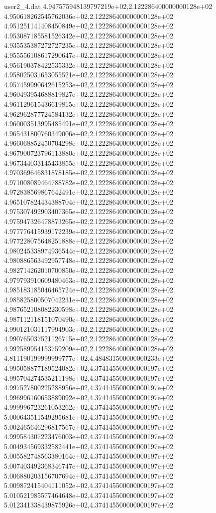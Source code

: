 \begin{filecontents}{user2_4.dat}
4.947575948139797219e+02,2.122286400000000128e+02
4.950618262545762036e+02,2.122286400000000128e+02
4.951251141408450849e+02,2.122286400000000128e+02
4.953087185581526342e+02,2.122286400000000128e+02
4.935535387272727235e+02,2.122286400000000128e+02
4.955556108617290647e+02,2.122286400000000128e+02
4.956190378422535332e+02,2.122286400000000128e+02
4.958025031653055521e+02,2.122286400000000128e+02
4.957459990642615253e+02,2.122286400000000128e+02
4.960493954688819827e+02,2.122286400000000128e+02
4.961129615436619815e+02,2.122286400000000128e+02
4.962962877724584132e+02,2.122286400000000128e+02
4.960003513995485491e+02,2.122286400000000128e+02
4.965431800760349006e+02,2.122286400000000128e+02
4.966068852450704298e+02,2.122286400000000128e+02
4.967900723796113880e+02,2.122286400000000128e+02
4.967344033145433855e+02,2.122286400000000128e+02
4.970369646831878185e+02,2.122286400000000128e+02
4.971008089464788782e+02,2.122286400000000128e+02
4.972838569867642491e+02,2.122286400000000128e+02
4.965107824434388704e+02,2.122286400000000128e+02
4.975307492903407365e+02,2.122286400000000128e+02
4.975947326478873265e+02,2.122286400000000128e+02
4.977776415939172239e+02,2.122286400000000128e+02
4.977228075648251888e+02,2.122286400000000128e+02
4.980245338974936544e+02,2.122286400000000128e+02
4.980886563492957748e+02,2.122286400000000128e+02
4.982714262010700850e+02,2.122286400000000128e+02
4.979793910609480463e+02,2.122286400000000128e+02
4.985183185046465724e+02,2.122286400000000128e+02
4.985825800507042231e+02,2.122286400000000128e+02
4.987652108082230598e+02,2.122286400000000128e+02
4.987112118151070490e+02,2.122286400000000128e+02
4.990121031117994903e+02,2.122286400000000128e+02
4.990765037521126715e+02,2.122286400000000128e+02
4.992589954153759209e+02,2.122286400000000128e+02
4.811190199999999777e+02,4.484831500000000233e+02
4.995058877189524082e+02,4.374145500000000197e+02
4.995704274535211198e+02,4.374145500000000197e+02
4.997527800225288956e+02,4.374145500000000197e+02
4.996996160653889092e+02,4.374145500000000197e+02
4.999996723261053262e+02,4.374145500000000197e+02
5.000643511549295681e+02,4.374145500000000197e+02
5.002465646296817567e+02,4.374145500000000197e+02
4.999584307223476003e+02,4.374145500000000197e+02
5.004934569332582441e+02,4.374145500000000197e+02
5.005582748563380164e+02,4.374145500000000197e+02
5.007403492368346747e+02,4.374145500000000197e+02
5.006880203156707694e+02,4.374145500000000197e+02
5.009872415404111052e+02,4.374145500000000197e+02
5.010521985577464648e+02,4.374145500000000197e+02
5.012341338439875926e+02,4.374145500000000197e+02

\end{filecontents}
